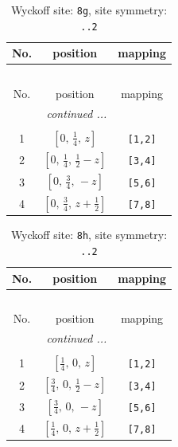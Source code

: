 \documentclass[fleqn,8pt]{jsarticle}
\begin{document}
\renewcommand{\arraystretch}{1.2}
\begin{longtable}{ccc}
\caption{Wyckoff site: {\tt 8g}, site symmetry: {\tt ..2}}
 \\
 \hline \hline
No. & position & mapping \\ \hline \endfirsthead

\multicolumn{2}{l}{\tablename\ \thetable{}} \\
 \hline \hline
No. & position & mapping \\ \hline \endhead

 \hline \hline
\multicolumn{2}{r}{\footnotesize\it continued ...} \\ \endfoot

 \hline \hline
\multicolumn{2}{r}{} \\ \endlastfoot

1 & $\left[ 0,\, \frac{1}{4},\, z \right]$ & {\tt [1,2]} \\ \hline
2 & $\left[ 0,\, \frac{1}{4},\, \frac{1}{2} - z \right]$ & {\tt [3,4]} \\ \hline
3 & $\left[ 0,\, \frac{3}{4},\, - z \right]$ & {\tt [5,6]} \\ \hline
4 & $\left[ 0,\, \frac{3}{4},\, z + \frac{1}{2} \right]$ & {\tt [7,8]} \\
\end{longtable}
\renewcommand{\arraystretch}{1.2}
\begin{longtable}{ccc}
\caption{Wyckoff site: {\tt 8h}, site symmetry: {\tt ..2}}
 \\
 \hline \hline
No. & position & mapping \\ \hline \endfirsthead

\multicolumn{2}{l}{\tablename\ \thetable{}} \\
 \hline \hline
No. & position & mapping \\ \hline \endhead

 \hline \hline
\multicolumn{2}{r}{\footnotesize\it continued ...} \\ \endfoot

 \hline \hline
\multicolumn{2}{r}{} \\ \endlastfoot

1 & $\left[ \frac{1}{4},\, 0,\, z \right]$ & {\tt [1,2]} \\ \hline
2 & $\left[ \frac{3}{4},\, 0,\, \frac{1}{2} - z \right]$ & {\tt [3,4]} \\ \hline
3 & $\left[ \frac{3}{4},\, 0,\, - z \right]$ & {\tt [5,6]} \\ \hline
4 & $\left[ \frac{1}{4},\, 0,\, z + \frac{1}{2} \right]$ & {\tt [7,8]} \\
\end{longtable}
\end{document}
